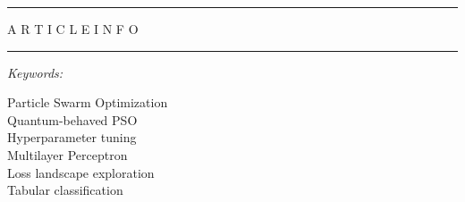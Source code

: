 \documentclass[10pt]{article}
\begin{document}
\noindent\rule{\textwidth}{0.4pt}\par\vspace{3pt}
\noindent\begin{minipage}[t]{0.265\textwidth}
{\fontsize{7.0pt}{9.0pt}\selectfont A R T I C L E \quad I N F O}\par\vspace{2pt}
\rule{\linewidth}{0.4pt}\par\vspace{5pt}
{\fontsize{6.4pt}{8.6pt}\selectfont\textit{Keywords:}}\par\vspace{2pt}
{\fontsize{6.4pt}{8.6pt}\selectfont
Particle Swarm Optimization\\
Quantum-behaved PSO\\
Hyperparameter tuning\\
Multilayer Perceptron\\
Loss landscape exploration\\
Tabular classification\par}
\end{minipage}%
\hspace{0.035\textwidth}%
\end{document}
